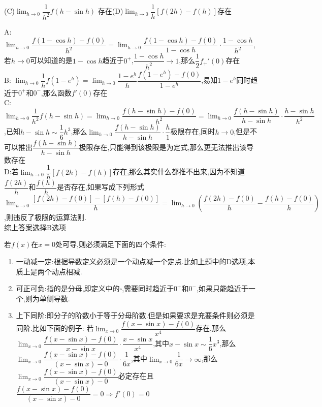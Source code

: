 \documentclass[8pt a4paper, oneside, UTF8]{ctexbook}  %
\begin{document}
\begin{sloppypar}
\begin{problem}
    (C)$\lim_{h\to0}\dfrac1{h^2}f(h-\sin h)$ 存在\quad(D)$\lim_{h\to0}\dfrac{1}{h}[f(2h)-f(h)]$存在
    \end{problem}
    \begin{solution}
        A: $\lim_{h \to 0}\dfrac{f(1 -\cos h)-f(0)}{h^2}=\lim_{h \to 0}\dfrac{f(1-\cos h)-f(0)}{1-\cos h}\cdot \dfrac{1-\cos h}{h^2}$,若$h \to 0$可以知道的是$1- \cos h$趋近于$0^+$,$\dfrac{1 - \cos h}{h^2} \to 1$,那么$\dfrac{1}{2}f_+'(0)$存在\\
        B: $\lim_{h \to 0}\dfrac{1}{h}f(1-e^h)=\lim_{h \to 0}\dfrac{1-e^h}{h}\dfrac{f(1-e^h)-f(0)}{1-e^h}$,易知$1-e^h$同时趋近于$0^+$和$0^-$,那么函数$f'(0)$存在\\
        C:$\lim_{h \to 0}\dfrac{1}{h^2}f(h- \sin h)=\lim_{h\to 0}\dfrac{f(h-\sin h)-f(0)}{h^2}=\lim_{h \to 0}\dfrac{f(h-\sin h)}{h -\sin h}\cdot \dfrac{h-\sin h}{h^2}$,已知$h -\sin h \sim \dfrac{1}{6}h^3$,那么$\lim_{h \to 0}\dfrac{f(h-\sin h)}{h -\sin h}\cdot \dfrac{h}{1}$极限存在,同时$h \to 0$,但是不可以推出$\dfrac{f(h-\sin h)}{h-\sin h}$极限存在,只能得到该极限是为定式,那么更无法推出该导数存在\\
        D:若$\lim_{h \to 0}\dfrac{1}{h}[f(2h)-f(h)]$存在,那么其实什么都推不出来,因为不知道$\dfrac{f(2h)}{h}$和$\dfrac{f(h)}{h}$是否存在,如果写成下列形式$\lim_{h \to 0}\dfrac{[f(2h)-f(0)]-[f(h)-f(0)]}{h}=\lim_{h \to 0}\left(\dfrac{f(2h)-f(0)}{h}-\dfrac{f(h)-f(0)}{h}\right)$,则违反了极限的运算法则.\\
        综上答案选择B选项
    \end{solution}
    \begin{conclusion}{若$f(x)$在$x=0$处可导,则必须满足下面的四个条件:}{}
        \begin{enumerate}
            \item 一动减一定:根据导数定义必须是一个动点减一个定点.比如上题中的D选项,本质上是两个动点相减.
            \item 可正可负:指的是分母,即定义中的$\square$,需要同时趋近于$0^+$和$0^-$,如果只能趋近于一个,则为单侧导数.
            \item 上下同阶:即分子的阶数小于等于分母阶数.但是如果要求是充要条件则必须是同阶.比如下面的例子:
                  若$\lim_{x\to 0}\dfrac{f(x-\sin x)-f(0)}{x^4}$存在,那么$\lim_{x\to 0}\dfrac{f(x-\sin x)-f(0)}{x-\sin x}\cdot \dfrac{x - \sin x}{x^4}$,其中$ x - \sin x \sim \dfrac{1}{6}x^3$,那么$\lim_{x\to 0}\dfrac{f(x-\sin x)-f(0)}{(x-\sin x)-0}\cdot \dfrac{1}{6x}$,其中$\lim_{x\to 0} \dfrac{1}{6x} \to \infty$,那么$\lim_{x\to 0}\dfrac{f(x-\sin x)-f(0)}{(x-\sin x)-0}$必定存在且$\dfrac{f(x-\sin x)-f(0)}{(x-\sin x)-0}=0 \Rightarrow f'(0)=0$

\end{enumerate}
\end{conclusion}
\end{sloppypar}
\end{document}
